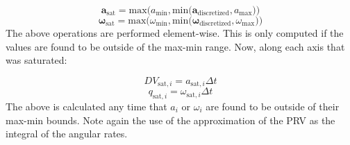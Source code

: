 \begin{equation}
	\bm{a}_{\mathrm{sat}} = \mathrm{max}\big(a_{\mathrm{min}}, \mathrm{min}\big(    \bm{a}_{\mathrm{discretized}}, a_{\mathrm{max}}    \big)   \big)
\end{equation}
\begin{equation}
\bm{\omega}_{\mathrm{sat}} = \mathrm{max}\big(\omega_{\mathrm{min}}, \mathrm{min}\big(    \bm{\omega}_{\mathrm{discretized}}, \omega_{\mathrm{max}}    \big)   \big)
\end{equation}
The above operations are performed element-wise. This is only computed if the values are found to be outside of the max-min range. Now, along each axis that was saturated:

\begin{equation}
	DV_{\mathrm{sat},i} = a_{\mathrm{sat},i} \Delta t
\end{equation}
\begin{equation}
q_{\mathrm{sat},i} = \omega_{\mathrm{sat},i}  \Delta t
\end{equation}
The above is calculated any time that $a_i$ or $\omega_i$ are found to be outside of their max-min bounds. Note again the use of the approximation of the PRV as the integral of the angular rates.

